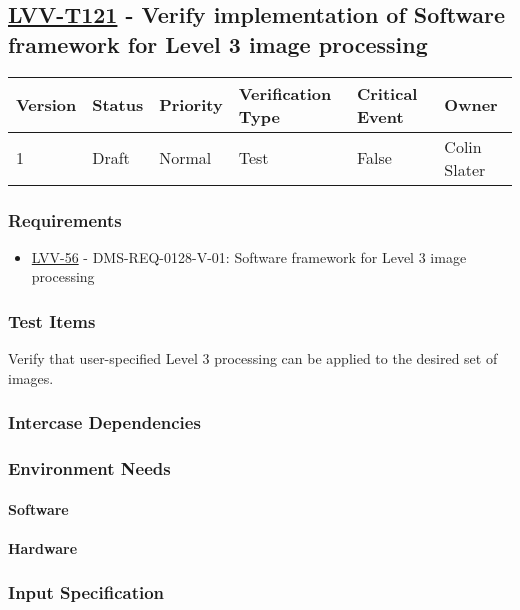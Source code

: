 \subsection{\href{https://jira.lsstcorp.org/secure/Tests.jspa\#/testCase/LVV-T121}{LVV-T121}
    - Verify implementation of Software framework for Level 3 image processing}\label{lvv-t121}

\begin{longtable}[]{llllll}
\toprule
Version & Status & Priority & Verification Type & Critical Event & Owner
\\\midrule
1 & Draft & Normal &
Test & False & Colin Slater
\\\bottomrule
\end{longtable}

\subsubsection{Requirements}
\begin{itemize}
\item \href{https://jira.lsstcorp.org/browse/LVV-56}{LVV-56} - DMS-REQ-0128-V-01: Software framework for Level 3 image processing
\end{itemize}

\subsubsection{Test Items}
Verify that user-specified Level 3 processing can be applied to the
desired set of images.



\subsubsection{Intercase Dependencies}

\subsubsection{Environment Needs}

\paragraph{Software}

\paragraph{Hardware}

\subsubsection{Input Specification}

